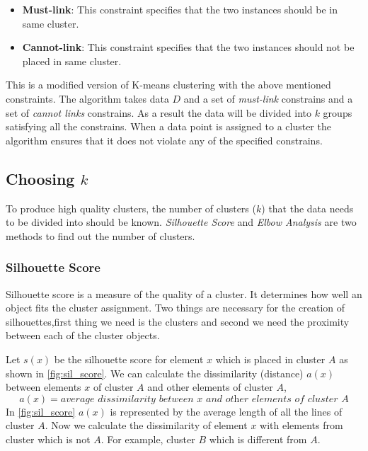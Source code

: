 \begin{itemize}
    \item \textbf{Must-link}: This constraint specifies that the two instances should be in same cluster.
    \item \textbf{Cannot-link}: This constraint specifies that the two instances should not be placed in same cluster.
\end{itemize}

This is a modified version of K-means clustering with the above mentioned constraints. The algorithm takes data $D$ and a set of \textit{must-link} constrains and a set of \textit{cannot links} constrains. As a result the data will be divided into $k$ groups satisfying all the constrains. When a data point is assigned to a cluster the algorithm ensures that it does not violate any of the specified constrains.



\subsection{Choosing $k$} \label{chooseK}
To produce high quality clusters, the number of clusters ($k$) that the data needs to be divided into should be known. \textit{Silhouette Score} \cite{rousseeuw1987silhouettes} and \textit{Elbow Analysis} \cite{thorndike1953belongs,ketchen1996application}  are two methods to find out the number of clusters.

\subsubsection{Silhouette Score}\label{silout}
Silhouette score is a measure of the quality of a cluster. It determines how well an object fits the cluster assignment. Two things are necessary for the creation of silhouettes,first thing we need is the clusters and second we need the proximity between each of the cluster objects.

Let $s(x)$ be the silhouette score for element $x$ which is placed in cluster $A$ as shown in \ref{fig:sil_score}. We can calculate the dissimilarity (distance) $a(x)$ between elements $x$ of cluster $A$ and other elements of cluster $A$,
\begin{equation}\label{eq:sil_1}
    a(x) = \textit{average dissimilarity between x and other elements of cluster A}
\end{equation}
In \ref{fig:sil_score} $a(x)$ is represented by the average length of all the lines of cluster $A$. Now we calculate the dissimilarity of element $x$ with elements from cluster which is not $A$. For example, cluster $B$ which is different from $A$.

